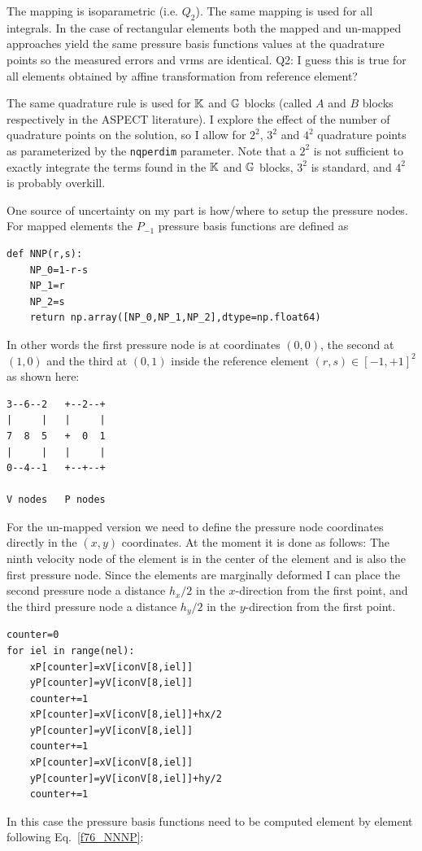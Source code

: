 The mapping is isoparametric (i.e. $Q_2$). The same mapping is used for all integrals.
In the case of rectangular elements both the mapped and un-mapped approaches 
yield the same pressure basis functions values at the quadrature points
so the measured errors and vrms are identical.
{\color{red} Q2: I guess this is true for all elements obtained by affine transformation
from reference element?} 

The same quadrature rule is used for ${\mathbb{K}}$ and ${\mathbb{G}}$ blocks (called $A$ and $B$ blocks respectively in the
ASPECT literature).
I explore the effect of the number of quadrature points on the solution, 
so I allow for $2^2$, $3^2$ and $4^2$ quadrature points
as parameterized by the \lstinline{nqperdim} parameter.
Note that a $2^2$ is not sufficient to exactly integrate the 
terms found in the ${\mathbb{K}}$ and ${\mathbb{G}}$ blocks, $3^2$ is standard, 
and $4^2$ is probably overkill.

One source of uncertainty on my part is how/where to setup the pressure nodes.
For mapped elements the $P_{-1}$ pressure basis functions are defined as 
\begin{lstlisting}
def NNP(r,s):
    NP_0=1-r-s
    NP_1=r
    NP_2=s
    return np.array([NP_0,NP_1,NP_2],dtype=np.float64)
\end{lstlisting}
In other words the first pressure node is at coordinates $(0,0)$,
the second at $(1,0)$ and the third at $(0,1)$ inside the reference element $(r,s)\in[-1,+1]^2$
as shown here:

\begin{verbatim}
3--6--2   +--2--+
|     |   |     |
7  8  5   +  0  1
|     |   |     |
0--4--1   +--+--+

V nodes   P nodes
\end{verbatim}


For the un-mapped version we need to define the pressure node coordinates 
directly in the $(x,y)$ coordinates.
At the moment it is done as follows: The ninth velocity node of the element is 
in the center of the element and is also the first pressure node.
Since the elements are marginally deformed I can place the second pressure node 
a distance $h_x/2$ in the $x$-direction from the first point, and the third pressure node 
a distance $h_y/2$ in the $y$-direction from the first point.

\begin{lstlisting}
counter=0
for iel in range(nel):
    xP[counter]=xV[iconV[8,iel]]
    yP[counter]=yV[iconV[8,iel]]
    counter+=1
    xP[counter]=xV[iconV[8,iel]]+hx/2
    yP[counter]=yV[iconV[8,iel]]
    counter+=1
    xP[counter]=xV[iconV[8,iel]]
    yP[counter]=yV[iconV[8,iel]]+hy/2
    counter+=1
\end{lstlisting}
In this case the pressure basis functions need to be computed
element by element following Eq.~\eqref{f76_NNNP}:


